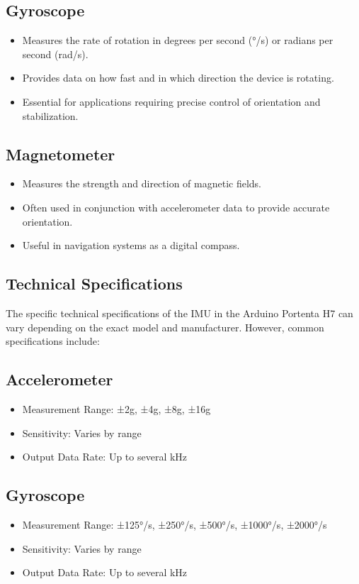 	\subsection{Gyroscope}
	\begin{itemize}
		\item Measures the rate of rotation in degrees per second (°/s) or radians per second (rad/s).
		\item Provides data on how fast and in which direction the device is rotating.
		\item Essential for applications requiring precise control of orientation and stabilization.
	\end{itemize}
	
	\subsection{Magnetometer}
	\begin{itemize}
		\item Measures the strength and direction of magnetic fields.
		\item Often used in conjunction with accelerometer data to provide accurate orientation.
		\item Useful in navigation systems as a digital compass.
	\end{itemize}
	
	
	\subsection{Technical Specifications}
	The specific technical specifications of the IMU in the Arduino Portenta H7 can vary depending on the exact model and manufacturer. However, common specifications include:
	
	\subsection{Accelerometer}
	\begin{itemize}
		\item Measurement Range: ±2g, ±4g, ±8g, ±16g
		\item Sensitivity: Varies by range
		\item Output Data Rate: Up to several kHz
	\end{itemize}
	
	\subsection{Gyroscope}
	\begin{itemize}
		\item Measurement Range: ±125°/s, ±250°/s, ±500°/s, ±1000°/s, ±2000°/s
		\item Sensitivity: Varies by range
		\item Output Data Rate: Up to several kHz
	\end{itemize}
	
